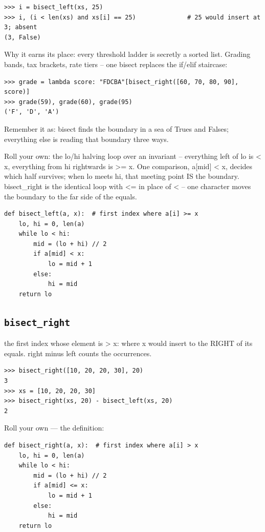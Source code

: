 \documentclass[10pt,letterpaper]{book}
\begin{document}
\begin{lstlisting}[style=ex]
>>> i = bisect_left(xs, 25)
>>> i, (i < len(xs) and xs[i] == 25)              # 25 would insert at 3; absent
(3, False)
\end{lstlisting}

Why it earns its place: every threshold ladder is secretly a sorted list. Grading bands, tax brackets, rate tiers -- one bisect replaces the if/elif staircase:

\begin{lstlisting}[style=ex]
>>> grade = lambda score: "FDCBA"[bisect_right([60, 70, 80, 90], score)]
>>> grade(59), grade(60), grade(95)
('F', 'D', 'A')
\end{lstlisting}

Remember it as: bisect finds the boundary in a sea of Trues and Falses; everything else is reading that boundary three ways.


Roll your own: the lo/hi halving loop over an invariant -- everything left of lo is < x, everything from hi rightwards is >= x. One comparison, a[mid] < x, decides which half survives; when lo meets hi, that meeting point IS the boundary. bisect\_right is the identical loop with <= in place of < -- one character moves the boundary to the far side of the equals.

\begin{lstlisting}[style=ex]
def bisect_left(a, x):  # first index where a[i] >= x
    lo, hi = 0, len(a)
    while lo < hi:
        mid = (lo + hi) // 2
        if a[mid] < x:
            lo = mid + 1
        else:
            hi = mid
    return lo
\end{lstlisting}

\subsection{\texttt{bisect\_right}}\label{def:bisect-right}
the first index whose element is > x: where x would insert to the RIGHT of its equals. right minus left counts the occurrences.
\begin{lstlisting}[style=ex]
>>> bisect_right([10, 20, 20, 30], 20)
3
>>> xs = [10, 20, 20, 30]
>>> bisect_right(xs, 20) - bisect_left(xs, 20)
2
\end{lstlisting}

Roll your own --- the definition:

\begin{lstlisting}[style=ex]
def bisect_right(a, x):  # first index where a[i] > x
    lo, hi = 0, len(a)
    while lo < hi:
        mid = (lo + hi) // 2
        if a[mid] <= x:
            lo = mid + 1
        else:
            hi = mid
    return lo
\end{lstlisting}
\end{document}
